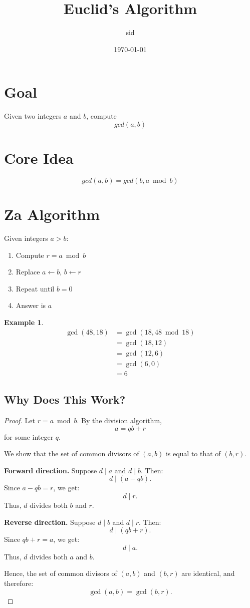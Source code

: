 \documentclass{article}
\title{Euclid's Algorithm}
\author{sid}
\date{\today}
\newtheorem{example}{Example}
\begin{document}
\maketitle

\section{Goal}
    Given two integers $a$ and $b$, compute
    $$ gcd(a,b) $$

\section{Core Idea}
    $$ gcd(a,b)=gcd(b,a\bmod{b}) $$

\section{Za Algorithm}
    Given integers $a > b$:

    \begin{enumerate}
        \item Compute $r = a \bmod b$
        \item Replace $a \leftarrow b$, $b \leftarrow r$
        \item Repeat until $b = 0$
        \item Answer is $a$
    \end{enumerate}

    \begin{example}
        \[
        \begin{aligned}
        \gcd(48, 18)
        &= \gcd(18, 48 \bmod 18) \\
        &= \gcd(18, 12) \\
        &= \gcd(12, 6) \\
        &= \gcd(6, 0) \\
        &= 6
        \end{aligned}
        \]
    \end{example}

\subsection*{Why Does This Work?}

\begin{proof}
Let $r = a \bmod b$. By the division algorithm,
\[
a = qb + r
\]
for some integer $q$.

We show that the set of common divisors of $(a,b)$ is equal to that of $(b,r)$.

\medskip
\noindent\textbf{Forward direction.}
Suppose $d \mid a$ and $d \mid b$. Then:
\[
d \mid (a - qb).
\]
Since $a - qb = r$, we get:
\[
d \mid r.
\]
Thus, $d$ divides both $b$ and $r$.

\medskip
\noindent\textbf{Reverse direction.}
Suppose $d \mid b$ and $d \mid r$. Then:
\[
d \mid (qb + r).
\]
Since $qb + r = a$, we get:
\[
d \mid a.
\]
Thus, $d$ divides both $a$ and $b$.

\medskip
Hence, the set of common divisors of $(a,b)$ and $(b,r)$ are identical, and therefore:
\[
\gcd(a,b) = \gcd(b,r).
\]
\end{proof}
\end{document}
